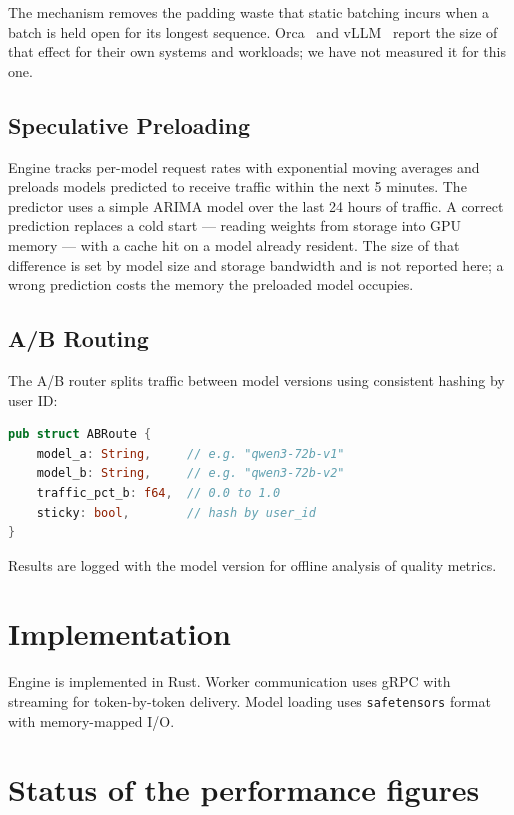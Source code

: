 \documentclass[11pt,twocolumn]{article}
\begin{document}
The mechanism removes the padding waste that static batching incurs when a batch is held open for its longest sequence. Orca~\cite{yu2022} and vLLM~\cite{kwon2023} report the size of that effect for their own systems and workloads; we have not measured it for this one.

\subsection{Speculative Preloading}

Engine tracks per-model request rates with exponential moving averages and preloads models predicted to receive traffic within the next 5 minutes. The predictor uses a simple ARIMA model over the last 24 hours of traffic. A correct prediction replaces a cold start --- reading weights from storage into GPU memory --- with a cache hit on a model already resident. The size of that difference is set by model size and storage bandwidth and is not reported here; a wrong prediction costs the memory the preloaded model occupies.

\subsection{A/B Routing}

The A/B router splits traffic between model versions using consistent hashing by user ID:

\begin{lstlisting}[language=Rust]
pub struct ABRoute {
    model_a: String,     // e.g. "qwen3-72b-v1"
    model_b: String,     // e.g. "qwen3-72b-v2"
    traffic_pct_b: f64,  // 0.0 to 1.0
    sticky: bool,        // hash by user_id
}
\end{lstlisting}

Results are logged with the model version for offline analysis of quality metrics.

\section{Implementation}

Engine is implemented in Rust. Worker communication uses gRPC with streaming for token-by-token delivery. Model loading uses \texttt{safetensors} format with memory-mapped I/O.

\section{Status of the performance figures}
\label{sec:figures}
\end{document}
